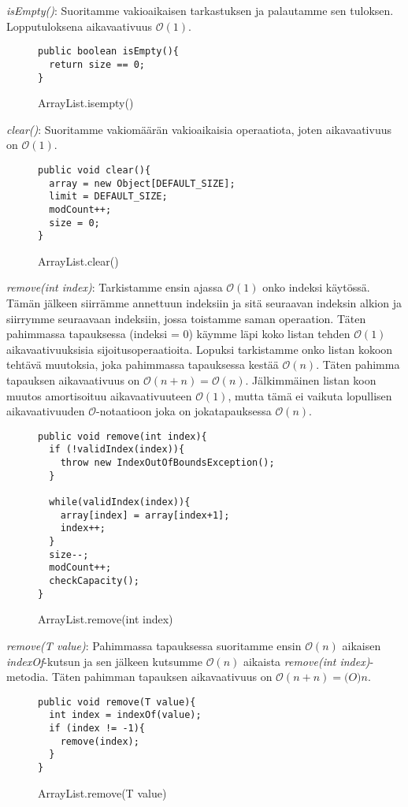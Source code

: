 \documentclass[12pt,a4paper]{article}
\begin{document}
\textit{isEmpty()}: Suoritamme vakioaikaisen tarkastuksen ja palautamme sen tuloksen. Lopputuloksena aikavaativuus $\mathcal{O}(1)$.
\begin{figure}[H]
\begin{lstlisting}
public boolean isEmpty(){
  return size == 0;
}
\end{lstlisting}
\caption{ArrayList.isempty()}
\end{figure}

\textit{clear()}: Suoritamme vakiomäärän vakioaikaisia operaatiota, joten aikavaativuus on $\mathcal{O}(1)$.
\begin{figure}[H]
\begin{lstlisting}
public void clear(){
  array = new Object[DEFAULT_SIZE];
  limit = DEFAULT_SIZE;
  modCount++;
  size = 0;
}
\end{lstlisting}
\caption{ArrayList.clear()}
\end{figure}

\textit{remove(int index)}: Tarkistamme ensin ajassa $\mathcal{O}(1)$ onko indeksi käytössä. Tämän jälkeen siirrämme annettuun indeksiin ja sitä seuraavan indeksin alkion ja siirrymme seuraavaan indeksiin, jossa toistamme saman operaation. Täten pahimmassa tapauksessa (indeksi = 0) käymme läpi koko listan tehden $\mathcal{O}(1)$ aikavaativuuksisia sijoitusoperaatioita. Lopuksi tarkistamme onko listan kokoon tehtävä muutoksia, joka pahimmassa tapauksessa kestää $\mathcal{O}(n)$. Täten pahimma tapauksen aikavaativuus on $\mathcal{O}(n+n) = \mathcal{O}(n)$. Jälkimmäinen listan koon muutos amortisoituu aikavaativuuteen $\mathcal{O}(1)$, mutta tämä ei vaikuta lopullisen aikavaativuuden $\mathcal{O}$-notaatioon joka on jokatapauksessa $\mathcal{O}(n)$.
\begin{figure}[H]
\begin{lstlisting}
public void remove(int index){
  if (!validIndex(index)){
    throw new IndexOutOfBoundsException();
  }
        
  while(validIndex(index)){
    array[index] = array[index+1];
    index++;
  }
  size--;
  modCount++;
  checkCapacity();
}
\end{lstlisting}
\caption{ArrayList.remove(int index)}
\end{figure}

\textit{remove(T value)}: Pahimmassa tapauksessa suoritamme ensin $\mathcal{O}(n)$ aikaisen \textit{indexOf}-kutsun ja sen jälkeen kutsumme $\mathcal{O}(n)$ aikaista \textit{remove(int index)}-metodia. Täten pahimman tapauksen aikavaativuus on $\mathcal{O}(n+n) = \mathcal(O){n}$.
\begin{figure}[H]
\begin{lstlisting}
public void remove(T value){
  int index = indexOf(value);
  if (index != -1){
    remove(index);
  }
}
\end{lstlisting}
\caption{ArrayList.remove(T value)}
\end{figure}
\end{document}
